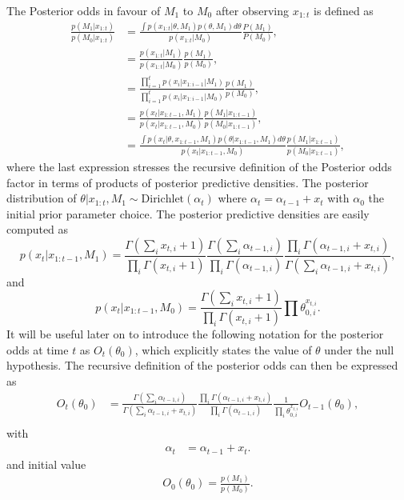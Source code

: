 \documentclass[11pt]{article}
\begin{document}
The Posterior odds in favour of $M_1$ to $M_0$ after observing $x_{1:t}$ is defined as
\begin{align}
  \label{eq:general_posterior_odds}
  \frac{p(M_1|x_{1:t})}{p(M_0|x_{1:t})}  &= \frac{\int p(x_{1:t}|\theta,M_1)p(\theta,M_1)d\theta}{p(x_{1:t}|M_0)}\frac{P(M_1)}{P(M_0)},\\
                      &=\frac{p(x_{1:t}|M_1)}{p(x_{1:t}|M_0)}\frac{p(M_1)}{p(M_0)},\\
                      &=\frac{\prod_{i=1}^{t}p(x_i|x_{1:i-1}|M_1)}{\prod_{i=1}^{t}p(x_i|x_{1:i-1}|M_0)}\frac{p(M_1)}{p(M_0)},\\
                      &=\frac{p(x_t|x_{1:t-1},M_1)}{p(x_t|x_{1:t-1},M_0)} \frac{p(M_1|x_{1:t-1})}{p(M_0|x_{1:t-1})},\\
    &=\frac{\int p(x_t|\theta,x_{1:t-1},M_1)p(\theta|x_{1:t-1},M_1)d\theta}{p(x_t|x_{1:t-1},M_0)}  \frac{p(M_1|x_{1:t-1})}{p(M_0|x_{1:t-1})} ,
\end{align}
where the last expression stresses the recursive definition of the Posterior odds factor in terms of products of posterior predictive densities.
The posterior distribution of $\theta| x_{1:t}, M_1 \sim \text{Dirichlet}(\alpha_t)$ where $\alpha_t = \alpha_{t-1}+x_t$ with $\alpha_0$ the initial prior parameter choice.
The posterior predictive densities are easily computed as
\begin{equation}
  \label{eq:posterior_predictive_m1}
   p(x_t|x_{1:t-1},M_1) = \frac{ \Gamma(\sum_i x_{t,i}+ 1)}{\prod_i \Gamma(x_{t,i} + 1)} \frac{\Gamma(\sum_i \alpha_{t-1,i})}{\prod_i \Gamma(\alpha_{t-1,i})} \frac{\prod_i \Gamma(\alpha_{t-1,i} + x_{t,i})}{\Gamma(\sum_i \alpha_{t-1,i} + x_{t,i})},
\end{equation}
and
\begin{equation}
  \label{eq:posterior_predictive_m2}
   p(x_t|x_{1:t-1},M_0) = \frac{ \Gamma(\sum_i x_{t,i} + 1)}{\prod_i \Gamma(x_{t,i} + 1)} \prod \theta_{0,i}^{x_{t,i}}.
 \end{equation}
 It will be useful later on to introduce the following notation for the posterior odds at time $t$ as $O_t(\theta_0)$, which explicitly states the value of $\theta$ under the null hypothesis.
The recursive definition of the posterior odds can then be expressed as
\begin{align}
  O_{t}(\theta_0) &= \frac{\Gamma(\sum_i \alpha_{t-1,i})}{\Gamma(\sum_i \alpha_{t-1,i} +  x_{t,i})} \frac{\prod_i \Gamma(\alpha_{t-1,i} + x_{t,i})}{\prod_i \Gamma(\alpha_{t-1,i})} \frac{1}{\prod_i \theta_{0,i}^{x_{t,i}}}  O_{t-1}(\theta_0),\\
\end{align}
with
\begin{align}
  \label{eq:alpha_update}
  \alpha_{t}&= \alpha_{t-1}+x_t.
\end{align}
and initial value
\begin{align}
  \label{eq:bayes_factor_seed}
O_0(\theta_0) = \frac{p(M_1)}{p(M_0)}.
\end{align}
\end{document}
